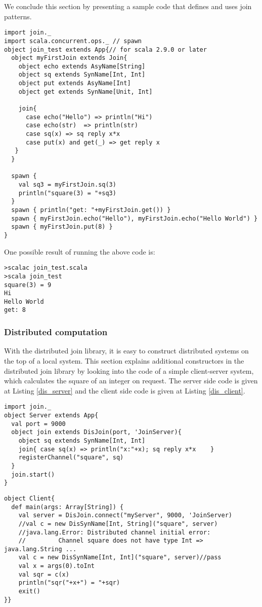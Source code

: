 We conclude this section by presenting a sample code that defines and uses join patterns.

\begin{lstlisting}[label=local_join_def_example, caption=Example code for defining join patterns (join\_test.scala)]
import join._
import scala.concurrent.ops._ // spawn
object join_test extends App{// for scala 2.9.0 or later
  object myFirstJoin extends Join{
    object echo extends AsyName[String]
    object sq extends SynName[Int, Int]
    object put extends AsyName[Int]
    object get extends SynName[Unit, Int]

    join{
      case echo("Hello") => println("Hi")
      case echo(str)  => println(str)
      case sq(x) => sq reply x*x
      case put(x) and get(_) => get reply x
   }
  }

  spawn {
    val sq3 = myFirstJoin.sq(3)
    println("square(3) = "+sq3)
  }
  spawn { println("get: "+myFirstJoin.get()) }
  spawn { myFirstJoin.echo("Hello"), myFirstJoin.echo("Hello World") }
  spawn { myFirstJoin.put(8) }
}
\end{lstlisting}
One possible result of running the above code is:
\begin{lstlisting}
>scalac join_test.scala
>scala join_test
square(3) = 9
Hi
Hello World
get: 8
\end{lstlisting}



\subsubsection{Distributed computation}


With the distributed join library, it is easy to construct distributed systems on the top of a local system.  This section explains additional constructors in the distributed join library by looking into the code of a simple client-server system, which calculates the square of an integer on request.  The server side code is given at Listing \ref{dis_server} and the client side code is given at Listing \ref{dis_client}.

\newpage

\begin{lstlisting}[label=dis_server, caption=Server.scala]
import join._
object Server extends App{
  val port = 9000
  object join extends DisJoin(port, 'JoinServer){
    object sq extends SynName[Int, Int]
    join{ case sq(x) => println("x:"+x); sq reply x*x    }
    registerChannel("square", sq)
  }
  join.start()
}
\end{lstlisting}
\begin{lstlisting}[label=dis_client, caption=Client.scala]
object Client{
  def main(args: Array[String]) {
    val server = DisJoin.connect("myServer", 9000, 'JoinServer)
    //val c = new DisSynName[Int, String]("square", server)
    //java.lang.Error: Distributed channel initial error: 
    //         Channel square does not have type Int => java.lang.String ...
    val c = new DisSynName[Int, Int]("square", server)//pass
    val x = args(0).toInt
    val sqr = c(x)
    println("sqr("+x+") = "+sqr)
    exit()
}}
\end{lstlisting}

